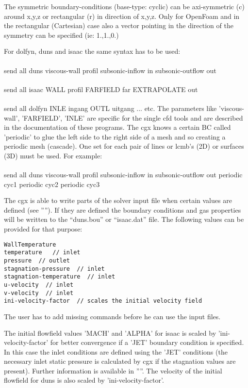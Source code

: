 \documentclass{article}
\begin{document}
The symmetric boundary-conditions (base-type: cyclic) can be axi-symmetric (c) around x,y,z or rectangular (r) in direction of x,y,z. Only for OpenFoam and in the rectangular (Cartesian) case also a vector pointing in the direction of the symmetry can be specified (ie: 1.,1.,0.)

For dolfyn, duns and isaac the same syntax has to be used:\\\\send all duns viscous-wall profil subsonic-inflow in subsonic-outflow out\\\\send all isaac WALL profil FARFIELD far EXTRAPOLATE out\\\\send all dolfyn INLE ingang OUTL uitgang ... etc. The parameters like 'viscous-wall', 'FARFIELD', 'INLE' are specific for the single cfd tools and are described in the documentation of these programs. The cgx knows a certain BC called 'periodic' to glue the left side to the right side of a mesh and so creating a periodic mesh (cascade). One set for each pair of lines or lcmb's (2D) or surfaces (3D) must be used. For example:\\\\send all duns viscous-wall profil subsonic-inflow in subsonic-outflow out periodic cyc1 periodic cyc2 periodic cyc3

The cgx is able to write parts of the solver input file when certain values are defined (see ''''). If they are defined the boundary conditions and gas properties will be written to the ``duns.bou'' or ``isaac.dat'' file. The following values can be provided for that purpose:
\begin{verbatim}
WallTemperature
temperature   // inlet
pressure  // outlet
stagnation-pressure  // inlet
stagnation-temperature  // inlet
u-velocity  // inlet
v-velocity  // inlet
ini-velocity-factor  // scales the initial velocity field 
\end{verbatim}
The user has to add missing commands before he can use the input files.

The initial flowfield values 'MACH' and 'ALPHA' for isaac is scaled by 'ini-velocity-factor' for better convergence if a 'JET' boundary condition is specified. In this case the inlet conditions are defined using the 'JET' conditions (the necessary inlet static pressure is calculated by cgx if the stagnation values are present). Further information is available in ''''. The velocity of the initial flowfield for duns is also scaled by 'ini-velocity-factor'.
\end{document}
